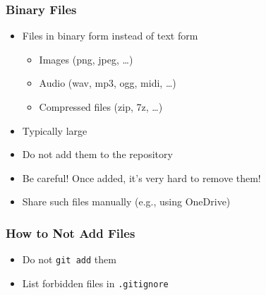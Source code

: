 \begin{frame}
  \frametitle{Binary Files}
  \begin{itemize}
    \item Files in binary form instead of text form
          \begin{itemize}
            \item Images (png, jpeg, \dots)
            \item Audio (wav, mp3, ogg, midi, \dots)
            \item Compressed files (zip, 7z, \dots)
          \end{itemize}
    \item Typically large
    \item {\color{red} Do not add them to the repository}
    \item Be careful! Once added, it's very hard to remove them!
    \item Share such files manually (e.g., using OneDrive)
  \end{itemize}
\end{frame}

\begin{frame}
  \frametitle{How to Not Add Files}
  \begin{itemize}
    \item Do not \texttt{git add} them
    \item List forbidden files in \texttt{.gitignore}
  \end{itemize}
  \vskip5mm
  \begin{center}
  \end{center}
\end{frame}